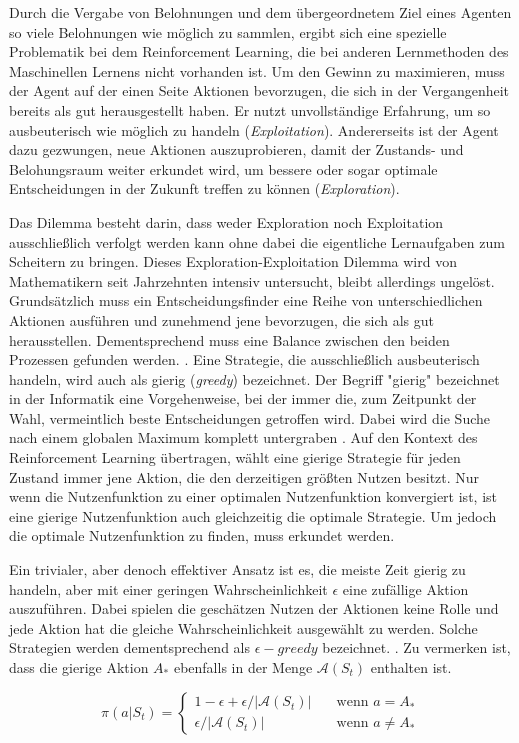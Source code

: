 Durch die Vergabe von Belohnungen und dem übergeordnetem Ziel eines Agenten so viele Belohnungen wie möglich zu sammlen, ergibt sich eine spezielle Problematik bei dem Reinforcement Learning, die bei anderen Lernmethoden des Maschinellen Lernens nicht vorhanden ist. Um den Gewinn zu maximieren, muss der Agent auf der einen Seite Aktionen bevorzugen, die sich in der Vergangenheit bereits als gut herausgestellt haben. Er nutzt unvollständige Erfahrung, um so ausbeuterisch wie möglich zu handeln (\textit{Exploitation}). Andererseits ist der Agent dazu gezwungen, neue Aktionen auszuprobieren, damit der Zustands- und Belohungsraum weiter erkundet wird, um bessere oder sogar optimale Entscheidungen in der Zukunft treffen zu können (\textit{Exploration}). 
\par 
Das Dilemma besteht darin, dass weder Exploration noch Exploitation ausschließlich verfolgt werden kann ohne dabei die eigentliche Lernaufgaben zum Scheitern zu bringen. Dieses Exploration-Exploitation Dilemma wird von Mathematikern seit Jahrzehnten intensiv untersucht, bleibt allerdings ungelöst. Grundsätzlich muss ein Entscheidungsfinder  eine Reihe von unterschiedlichen Aktionen ausführen und zunehmend jene bevorzugen, die sich als gut herausstellen. Dementsprechend muss eine Balance zwischen den beiden Prozessen gefunden werden. \cite[S.~3]{Sutton1998}.
Eine Strategie, die ausschließlich ausbeuterisch handeln, wird auch als gierig (\textit{greedy}) bezeichnet. Der Begriff "gierig" bezeichnet in der Informatik eine Vorgehenweise, bei der immer die, zum Zeitpunkt der Wahl, vermeintlich beste Entscheidungen getroffen wird. Dabei wird die Suche nach einem globalen Maximum komplett untergraben \cite[S.~203]{greedy}. Auf den Kontext des Reinforcement Learning übertragen, wählt eine gierige Strategie für jeden Zustand immer jene Aktion, die den derzeitigen größten Nutzen besitzt. Nur wenn die Nutzenfunktion zu einer optimalen Nutzenfunktion konvergiert ist, ist eine gierige Nutzenfunktion auch gleichzeitig die optimale Strategie. Um jedoch die optimale Nutzenfunktion zu finden, muss erkundet werden.
\par
Ein trivialer, aber denoch effektiver Ansatz ist es, die meiste Zeit gierig zu handeln, aber mit einer geringen Wahrscheinlichkeit $\epsilon$ eine zufällige Aktion auszuführen. Dabei spielen die geschätzen Nutzen der Aktionen keine Rolle und jede Aktion hat die gleiche Wahrscheinlichkeit ausgewählt zu werden. Solche Strategien werden dementsprechend als $\epsilon-greedy$ bezeichnet. \cite[S.~28]{Sutton1998}. Zu vermerken ist, dass die gierige Aktion $A_*$ ebenfalls in der Menge $\mathcal{A}(S_t)$ enthalten ist.

\begin{equation}\label{eq:greedyProbs}
    \pi(a|S_t) =   
        \begin{cases}
            1-\epsilon + \epsilon / |\mathcal{A}(S_t)|      & \quad \text{wenn } a = A_* \\
            \epsilon / |\mathcal{A}(S_t)|  & \quad \text{wenn } a \neq A_*
        \end{cases}
\end{equation}